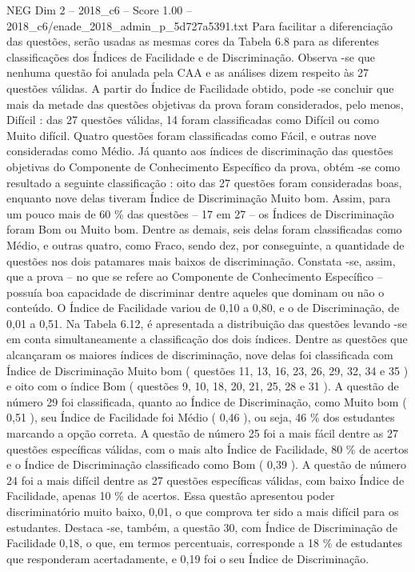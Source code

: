 \begin{textsample}{NEG Dim 2 – 2018\_c6 – Score 1.00 – 2018\_c6/enade\_2018\_admin\_p\_5d727a5391.txt}
Para facilitar a diferenciação das questões, serão usadas as mesmas cores da Tabela 6.8 para as diferentes classificações dos Índices de Facilidade e de Discriminação.
Observa -se que nenhuma questão foi anulada pela CAA e as análises dizem respeito às 27 questões válidas.
A partir do Índice de Facilidade obtido, pode -se concluir que mais da metade das questões objetivas da prova foram considerados, pelo menos, Difícil : das 27 questões válidas, 14 foram classificadas como Difícil ou como Muito difícil.
Quatro questões foram classificadas como Fácil, e outras nove consideradas como Médio.
Já quanto aos índices de discriminação das questões objetivas do Componente de Conhecimento Específico da prova, obtém -se como resultado a seguinte classificação : oito das 27 questões foram consideradas boas, enquanto nove delas tiveram Índice de Discriminação Muito bom.
Assim, para um pouco mais de 60 \% das questões – 17 em 27 – os Índices de Discriminação foram Bom ou Muito bom.
Dentre as demais, seis delas foram classificadas como Médio, e outras quatro, como Fraco, sendo dez, por conseguinte, a quantidade de questões nos dois patamares mais baixos de discriminação.
Constata -se, assim, que a prova – no que se refere ao Componente de Conhecimento Específico – possuía boa capacidade de discriminar dentre aqueles que dominam ou não o conteúdo.
O Índice de Facilidade variou de 0,10 a 0,80, e o de Discriminação, de 0,01 a 0,51.
Na Tabela 6.12, é apresentada a distribuição das questões levando -se em conta simultaneamente a classificação dos dois índices.
Dentre as questões que alcançaram os maiores índices de discriminação, nove delas foi classificada com Índice de Discriminação Muito bom ( questões 11, 13, 16, 23, 26, 29, 32, 34 e 35 ) e oito com o índice Bom ( questões 9, 10, 18, 20, 21, 25, 28 e 31 ).
A questão de número 29 foi classificada, quanto ao Índice de Discriminação, como Muito bom ( 0,51 ), seu Índice de Facilidade foi Médio ( 0,46 ), ou seja, 46 \% dos estudantes marcando a opção correta.
A questão de número 25 foi a mais fácil dentre as 27 questões específicas válidas, com o mais alto Índice de Facilidade, 80 \% de acertos e o Índice de Discriminação classificado como Bom ( 0,39 ).
A questão de número 24 foi a mais difícil dentre as 27 questões específicas válidas, com baixo Índice de Facilidade, apenas 10 \% de acertos.
Essa questão apresentou poder discriminatório muito baixo, 0,01, o que comprova ter sido a mais difícil para os estudantes.
Destaca -se, também, a questão 30, com Índice de Discriminação de Facilidade 0,18, o que, em termos percentuais, corresponde a 18 \% de estudantes que responderam acertadamente, e 0,19 foi o seu Índice de Discriminação.

\end{textsample}
